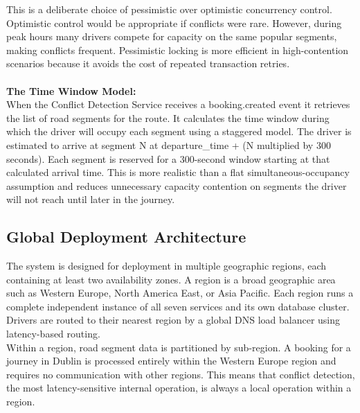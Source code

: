 \documentclass{article}
\begin{document}
This is a deliberate choice of pessimistic over optimistic concurrency control. Optimistic control would be appropriate if conflicts were rare. However, during peak hours many drivers compete for capacity on the same popular segments, making conflicts frequent. Pessimistic locking is more efficient in high-contention scenarios because it avoids the cost of repeated transaction retries.\\\\
\textbf{The Time Window Model:}\\
When the Conflict Detection Service receives a booking.created event it retrieves the list of road segments for the route. It calculates the time window during which the driver will occupy each segment using a staggered model. The driver is estimated to arrive at segment N at departure_time + (N multiplied by 300 seconds). Each segment is reserved for a 300-second window starting at that calculated arrival time. This is more realistic than a flat simultaneous-occupancy assumption and reduces unnecessary capacity contention on segments the driver will not reach until later in the journey.

\subsection{Global Deployment Architecture}
The system is designed for deployment in multiple geographic regions, each containing at least two availability zones. A region is a broad geographic area such as Western Europe, North America East, or Asia Pacific. Each region runs a complete independent instance of all seven services and its own database cluster. Drivers are routed to their nearest region by a global DNS load balancer using latency-based routing. \\
Within a region, road segment data is partitioned by sub-region. A booking for a journey in Dublin is processed entirely within the Western Europe region and requires no communication with other regions. This means that conflict detection, the most latency-sensitive internal operation, is always a local operation within a region.
\end{document}
